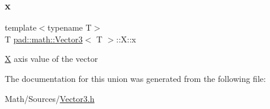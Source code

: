 \mbox{\label{unionpad_1_1math_1_1_vector3_1_1_x_a9332c00a4e6cfe6d551f499ef424a7b0}} 
\subsubsection{\texorpdfstring{x}{x}}
{\footnotesize\ttfamily template$<$typename T$>$ \\
T \mbox{\hyperlink{structpad_1_1math_1_1_vector3}{pad\+::math\+::\+Vector3}}$<$ T $>$\+::X\+::x}

\mbox{\hyperlink{unionpad_1_1math_1_1_vector3_1_1_x}{X}} axis value of the vector 

The documentation for this union was generated from the following file\+:\begin{DoxyCompactItemize}
\item 
Math/\+Sources/\mbox{\hyperlink{_vector3_8h}{Vector3.\+h}}\end{DoxyCompactItemize}
